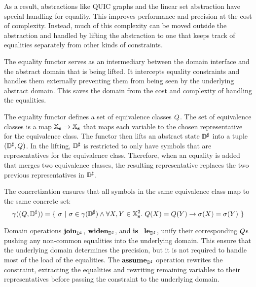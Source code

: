 As a result, abstractions like QUIC graphs and the linear set abstraction have special handling for equality.  This improves performance and precision at the cost of complexity.  Instead, much of this complexity can be moved outside the abstraction and handled by lifting the abstraction to one that keeps track of equalities separately from other kinds of constraints.

The equality functor serves as an intermediary between the domain interface and the abstract domain that is being lifted.  It intercepts equality constraints and handles them externally preventing them from being seen by the underlying abstract domain.  This saves the domain from the cost and complexity of handling the equalities.

The equality functor defines a set of equivalence classes $Q$.  The set of equivalence classes is a map $\mathbb{X}_{\bf s} \rightarrow \mathbb{X}_{\bf s}$ that maps each variable to the chosen representative for the equivalence class.  The functor then lifts an abstract state ${\mathbb{D}}^{\sharp}$ into a tuple $({\mathbb{D}}^{\sharp}, Q)$.  In the lifting, ${\mathbb{D}}^{\sharp}$ is restricted to only have symbols that are representatives for the equivalence class.  Therefore, when an equality is added that merges two equivalence classes, the resulting representative replaces the two previous representatives in ${\mathbb{D}}^{\sharp}$.

The concretization ensures that all symbols in the same equivalence class map to the same concrete set:
\begin{align*}
\gamma((Q,{\mathbb{D}}^{\sharp})) = \{ \ \sigma \ | \ \sigma \in \gamma({\mathbb{D}}^{\sharp}) \wedge \forall X,Y \in \mathbb{X}_{\bf s}^2. \; Q(X) = Q(Y) \rightarrow \sigma(X) = \sigma(Y) \ \}
\end{align*}

Domain operations $\textbf{join}_{{\mathbb{D}}^{\sharp}}$, $\textbf{widen}_{{\mathbb{D}}^{\sharp}}$, and $\textbf{is\_le}_{{\mathbb{D}}^{\sharp}}$, unify their corresponding $Q$s pushing any non-common equalities into the underlying domain.  This ensure that the underlying domain determines the precision, but it is not required to handle most of the load of the equalities.  The $\textbf{assume}_{{\mathbb{D}}^{\sharp}}$ operation rewrites the constraint, extracting the equalities and rewriting remaining variables to their representatives before passing the constraint to the underlying domain.
 


